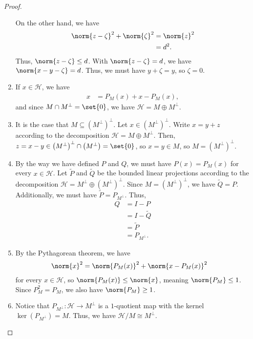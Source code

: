 \documentclass[10pt]{mypackage}
\begin{document}
\begin{proof}
\begin{enumerate}[(1)]
      On the other hand, we have
      \begin{align*}
        \norm{z - \zeta}^2 + \norm{\zeta}^2 &= \norm{z}^2\\
                                            &= d^2.
      \end{align*}
      Thus, $\norm{ z - \zeta } \leq d$. With $\norm{z - \zeta} = d$, we have $\norm{x - y - \zeta} = d$. Thus, we must have $y + \zeta = y$, so $\zeta = 0$.
    \item If $x\in \mathcal{H}$, we have
      \begin{align*}
        x &= P_M\left(x\right) + x - P_M\left(x\right),
      \end{align*}
      and since $M\cap M^{\perp} = \set{0}$, we have $\mathcal{H} = M\oplus M^{\perp}$.
    \item It is the case that $M\subseteq \left(M^{\perp}\right)^{\perp}$. Let $x\in \left(M^{\perp}\right)^{\perp}$. Write $x = y + z$ according to the decomposition $\mathcal{H} = M\oplus M^{\perp}$. Then, $z = x - y \in \left(M^{\perp}\right)^{\perp}\cap \left(M^{\perp}\right) = \set{0}$, so $x = y\in M$, so $M = \left(M^{\perp}\right)^{\perp}$.
    \item By the way we have defined $P$ and $Q$, we must have $P(x)  = P_M(x)$ for every $x\in \mathcal{H}$. Let $\widetilde{P}$ and $\widetilde{Q}$ be the bounded linear projections according to the decomposition $\mathcal{H} = M^{\perp}\oplus \left(M^{\perp}\right)^{\perp}$. Since $M = \left(M^{\perp}\right)^{\perp}$, we have $\widetilde{Q} = P$. Additionally, we must have $\widetilde{P} = P_{M^{\perp}}$. Thus,
      \begin{align*}
        Q &= I - P\\
          &= I - \widetilde{Q}\\
          &= \widetilde{P}\\
          &= P_{M^{\perp}}.
      \end{align*}
    \item By the Pythagorean theorem, we have
      \begin{align*}
        \norm{x}^2 &= \norm{P_M(x)}^2 + \norm{x-P_M(x)}^2
      \end{align*}
      for every $x\in \mathcal{H}$, so $\norm{P_M(x)}\leq \norm{x}$, meaning $\norm{P_M} \leq 1$. Since $P_{M}^2 = P_{M}$, we also have $\norm{P_M} \geq 1$.
    \item Notice that $P_{M^{\perp}}:\mathcal{H}\rightarrow M^{\perp}$ is a $1$-quotient map with the kernel $\ker\left(P_{M^{\perp}}\right) = M$. Thus, we have $\mathcal{H}/M \cong M^{\perp}$.
  \end{enumerate}
\end{proof}
\end{document}
